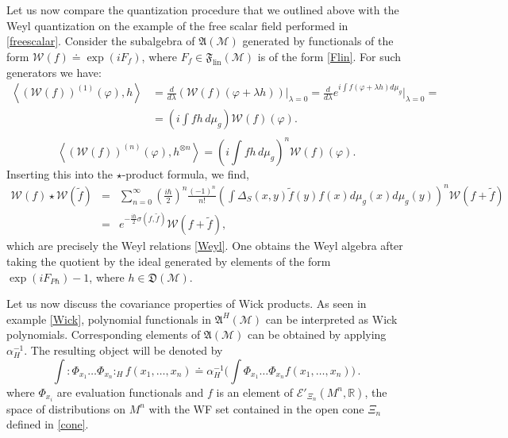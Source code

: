 \documentclass[11pt]{article}
\newcommand{\fA}{\mathfrak{A}}
\newcommand{\D}{\mathfrak{D}}
\newcommand{\F}{\mathfrak{F}}
\newcommand{\Ecal}{\mathcal{E}}
\newcommand{\Mcal}{\mathcal{M}}
\newcommand{\Wcal}{\mathcal{W}}
\newcommand{\RR}{\mathbb{R}}           %
\newcommand{\al}{\alpha}
\newcommand{\ph}{\varphi}
\newcommand{\sst}[1]{\scriptscriptstyle{#1}}  %
\newcommand{\1}{\mathds{1}}                         %
\newcommand{\be}{\begin{equation}}
\newcommand{\ee}{\end{equation}}
\begin{document}
{{Let us now compare the quantization procedure that we outlined above with the Weyl quantization on the example of the free scalar field performed in \ref{freescalar}. Consider the subalgebra of $\fA(\Mcal)$ generated by functionals of the form $\Wcal(f)\doteq\exp(iF_f)$, where $F_f\in \F_{\textrm{lin}}(\Mcal)$ is of the form \eqref{Flin}. For such generators we have:
\begin{align*}
\left< (\Wcal(f))^{(1)}(\ph),h\right>&= \frac{d}{d\lambda}\left( \Wcal(f) (\ph + \lambda h)\right)|_{\lambda=0}= \frac{d}{d \lambda}  e^{i \int  f (\ph + \lambda h)d\mu_g} \big|_{\lambda=0}=\\
&=\left( i \int f h\,d\mu_g\right) \Wcal(f)(\ph).\\
\end{align*}
\[
\left<(\Wcal(f))^{(n)}(\ph),h^{\otimes n}\right>=  \left( i \int f h\,d\mu_g\right)^n \Wcal(f)(\ph).
\]
Inserting this into the $\star$-product formula, we find,
\begin{eqnarray*}
\Wcal(f) \star \Wcal(\tilde{f}) &=&  \sum_{n=0}^{\infty} \left( \frac{i \hbar}{2}\right)^n \frac{(-1)^n}{n!} \left( \int \Delta_S(x,y) \tilde{f}(y)f(x)d\mu_g(x)d\mu_g(y)\right)^n\Wcal(f+\tilde{f})\\
&=& e^{-\frac{i \hbar}{2}\sigma(f,\tilde{f})} \Wcal(f+\tilde{f}),
\end{eqnarray*}
which are precisely the Weyl relations \eqref{Weyl}. One obtains the Weyl algebra after taking the quotient by the ideal generated by elements of the form $\exp(iF_{Ph})-1$, where $h\in\D(\Mcal)$.

 Let us now discuss the covariance properties of Wick products. As seen in example \ref{Wick}, polynomial functionals in $\fA^{\sst H}(\Mcal)$ can be interpreted as Wick polynomials.
Corresponding elements of $\fA(\Mcal)$ can be obtained by applying $\al_H^{-1}$. The resulting object will be denoted by
\be\label{polynomials1}
\int :\Phi_{x_1}\dots\Phi_{x_n}:_H f(x_1,\dots, x_n)\doteq \al^{-1}_H\Big(\int \Phi_{x_1}\dots\Phi_{x_n} f(x_1,\dots, x_n)\Big)\,.
\ee
where $\Phi_{x_i}$ are evaluation functionals and $f$ is an element of $\Ecal'_{\Xi_n}(M^n,\RR)$, the space of distributions on $M^n$ with the WF set contained in the open cone $\Xi_n$ defined in \eqref{cone}.
 
}}
\end{document}
